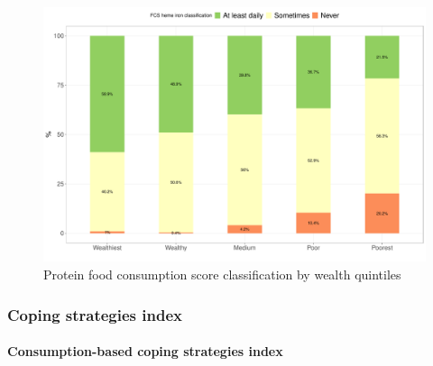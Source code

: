 \documentclass[12pt,a4paper]{article}
\let\oldparagraph\paragraph
\renewcommand{\paragraph}[1]{\oldparagraph{#1}\mbox{}}
\begin{document}
\begin{figure}[H]

{\centering \includegraphics{kayinReport_files/figure-latex/fcsn6plot-1} 

}

\caption{Protein food consumption score classification by wealth quintiles}\label{fig:fcsn6plot}
\end{figure}

\hypertarget{csi-results}{%
\subsubsection{Coping strategies index}\label{csi-results}}

\hypertarget{ccsi-results}{%
\paragraph{Consumption-based coping strategies index}\label{ccsi-results}}
\end{document}
